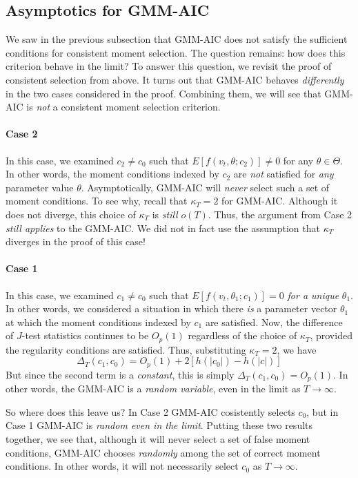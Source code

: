 \documentclass[12pt]{article}
\theoremstyle{definition}
\begin{document}
\subsection{Asymptotics for GMM-AIC}
We saw in the previous subsection that GMM-AIC does not satisfy the sufficient conditions for consistent moment selection. The question remains: how does this criterion behave in the limit? To answer this question, we revisit the proof of consistent selection from above. It turns out that GMM-AIC behaves \emph{differently} in the two cases considered in the proof. Combining them, we will see that GMM-AIC is \emph{not} a consistent moment selection criterion.

\paragraph{Case 2} In this case, we examined $c_2 \neq c_0$ such that $E[f(v_t, \theta; c_2)]\neq 0$ for any $\theta \in \Theta$. In other words, the moment conditions indexed by $c_2$ are \emph{not} satisfied for \emph{any} parameter value $\theta$. Asymptotically, GMM-AIC will \emph{never} select such a set of moment conditions. To see why, recall that $\kappa_T = 2$ for GMM-AIC. Although it does not diverge, this choice of $\kappa_T$ is \emph{still} $o(T)$. Thus, the argument from Case 2 \emph{still applies} to the GMM-AIC. We did not in fact use the assumption that $\kappa_T$ diverges in the proof of this case! 

\paragraph{Case 1} In this case, we examined $c_1\neq c_0$ such that $E[f(v_t, \theta_1;c_1)]=0$ \emph{for a unique} $\theta_1$. In other words, we considered a situation in which there \emph{is} a parameter vector $\theta_1$ at which the moment conditions indexed by $c_1$ are satisfied. Now, the difference of $J$-test statistics continues to be $O_p(1)$ regardless of the choice of $\kappa_T$, provided the regularity conditions are satisfied. Thus, substituting $\kappa_T = 2$, we have
	$$\Delta_T(c_1,c_0) = O_p(1) + 2\left[h(|c_0|) - h(|c|) \right]$$
But since the second term is a \emph{constant}, this is simply $\Delta_T(c_1,c_0) = O_p(1)$. In other words, the GMM-AIC is a \emph{random variable}, even in the limit as $T\rightarrow \infty$.

So where does this leave us? In Case 2 GMM-AIC cosistently selects $c_0$, but in Case 1 GMM-AIC is \emph{random even in the limit}. Putting these two results together, we see that, although it will never select a set of false moment conditions, GMM-AIC chooses \emph{randomly} among the set of correct moment conditions. In other words, it will not necessarily select $c_0$ as $T\rightarrow \infty$. 
\end{document}
